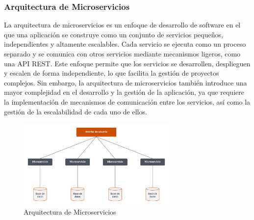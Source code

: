 \subsubsection{Arquitectura de Microservicios}
La arquitectura de microservicios es un enfoque de desarrollo de software en el que una aplicación se construye como un conjunto de servicios pequeños, independientes y altamente escalables. Cada servicio se ejecuta como un proceso separado y se comunica con otros servicios mediante mecanismos ligeros, como una API REST.
Este enfoque permite que los servicios se desarrollen, desplieguen y escalen de forma independiente, lo que facilita la gestión de proyectos complejos. Sin embargo, la arquitectura de microservicios también introduce una mayor complejidad en el desarrollo y la gestión de la aplicación, ya que requiere la implementación de mecanismos de comunicación entre los servicios, así como la gestión de la escalabilidad de cada uno de ellos.
\begin{figure}[H]
    \centering
    \includegraphics[width=0.7\textwidth]{figures/4-Estudio-viabilidad/4_Microservicios.png}
    \caption{Arquitectura de Microservicios}
    \label{fig:arquitectura_microservicios}
    \hypertarget{fig:arquitectura_microservicios}{}
\end{figure}

